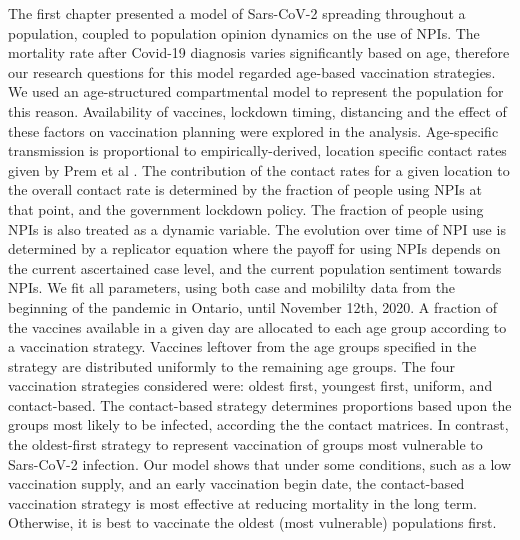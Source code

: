 The first chapter presented a model of Sars-CoV-2 spreading throughout a population, coupled to population opinion dynamics on the use of NPIs. The mortality rate after Covid-19 diagnosis varies significantly based on age, therefore our research questions for this model regarded age-based vaccination strategies. We used an age-structured compartmental model to represent the population for this reason. Availability of vaccines, lockdown timing, distancing and the effect of these factors on vaccination planning were explored in the analysis. Age-specific transmission is proportional to empirically-derived, location specific contact rates given by Prem et al \cite{prem2020projecting}. The contribution of the contact rates for a given location to the overall contact rate is determined by the fraction of people using NPIs at that point, and the government lockdown policy. The fraction of people using NPIs is also treated as a dynamic variable. The evolution over time of NPI use is determined by a replicator equation where the payoff for using NPIs depends on the current ascertained case level, and the current population sentiment towards NPIs. We fit all parameters, using both case and mobililty data from the beginning of the pandemic in Ontario, until November 12th, 2020. A fraction of the vaccines available in a given day are allocated to each age group according to a vaccination strategy. Vaccines leftover from the age groups specified in the strategy are distributed uniformly to the remaining age groups. The four vaccination strategies considered were: oldest first, youngest first, uniform, and contact-based. The contact-based strategy determines proportions based upon the groups most likely to be infected, according the the contact matrices. In contrast, the oldest-first strategy to represent vaccination of groups most vulnerable to Sars-CoV-2 infection. Our model shows that under some conditions, such as a low vaccination supply, and an early vaccination begin date, the contact-based vaccination strategy is most effective at reducing mortality in the long term. Otherwise, it is best to vaccinate the oldest (most vulnerable) populations first.


